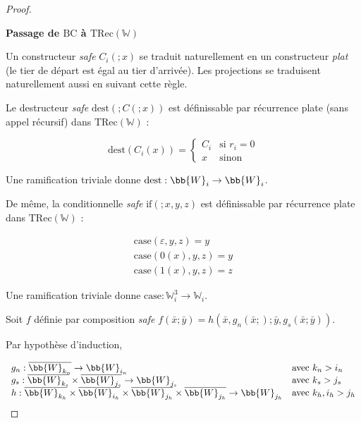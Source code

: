 \documentclass{report}
\newcommand{\TRec}[1]{\text{TRec}\left(\mathbb{#1}\right)}
\begin{document}
		\begin{proof}
			\textcolor{white}{T} %
			
			\textbf{Passage de $\text{BC}$ à $\TRec{W}$}
			
			Un constructeur \emph{safe} $C_i(; x)$ se traduit naturellement en un constructeur \emph{plat} (le tier de départ est égal au tier d'arrivée). Les projections se traduisent naturellement aussi en suivant cette règle.
			
			Le destructeur \emph{safe} $\text{dest} \left( ; C\left(; x\right) \right)$ est définissable par récurrence plate (sans appel récursif) dans $\TRec{W}$ : 
			
			\[
				\text{dest} \left( C_i\left( x\right) \right) = 
				\left\lbrace \begin{array}{ll}
				C_i	& \text{si $r_i = 0$} \\
				x	& \text{sinon}
				\end{array} \right.
			\]
			
			Une ramification triviale donne $\text{dest} : \bb{W}_i \to \bb{W}_i$.
			
			De même, la conditionnelle \emph{safe} $\text{if} \left( ; x, y, z\right)$ est définissable par récurrence plate dans $\TRec{W}$ : 
			
			\[
				\begin{array}{l}
				\text{case}(\varepsilon, y, z) = y \\
				\text{case}(0(x), y, z) = y \\
				\text{case}(1(x), y, z) = z
				\end{array}
			\]
			
			Une ramification triviale donne $\text{case} : \mathbb{W}_i^3 \to \mathbb{W}_i$.
			
			Soit $f$ définie par composition \emph{safe} $f\left( \bar{x} ; \bar{y}\right) = h\left( \bar{x}, g_n( \bar{x}; ) ; \bar{y}, g_s( \bar{x}; \bar{y} ) \right)$.
			
			Par hypothèse d'induction, 
			
			\[
				\begin{array}{ll}
				g_n : \overline{\bb{W}_{k_n}} \to \bb{W}_{i_n} & \text{avec $k_n > i_n$}\\
				g_s : \overline{\bb{W}_{k_s}} \times \overline{\bb{W}_{j_s}} \to \bb{W}_{j_s} & \text{avec $k_s > j_s$} \\
				h : \overline{\bb{W}_{k_h}} \times \overline{\bb{W}_{i_h}} \times \overline{\bb{W}_{j_h}} \times \overline{\bb{W}_{j_h}} \to \bb{W}_{j_h} & \text{avec $k_h, i_h > j_h$}
				\end{array}
			\]
			

\end{proof}
\end{document}
